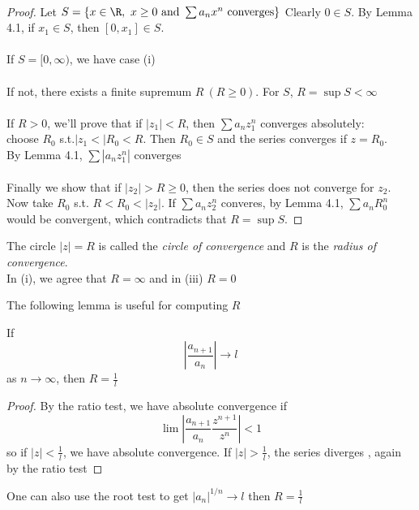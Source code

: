 \begin{theorem}
\begin{tikzpicture}[x=0.75pt,y=0.75pt,yscale=-1,xscale=1]
\end{tikzpicture}\\
\begin{proof}
Let $S = \{x\in\R, \ x\geq 0\text{ and }\sum a_nx^n\text{ converges}\}$
Clearly $0\in S$. By Lemma 4.1, if $x_1\in S$, then $[0,x_1]\in S$.\\
\\
If $S = [0,\infty)$, we have case (i)\\
\\
If not, there exists a finite supremum $R \ (R\geq 0)$. For $S$, $R = \sup S < \infty$\\
\\
If $R>0$, we'll prove that if $|z_1|<R$, then $\sum a_n z_1^n$ converges absolutely:\\
choose $R_0$ s.t.$|z_1<|R_0<R$. Then $R_0\in S$ and the series converges if $z=R_0$.\\ By Lemma 4.1, $\sum |a_nz_1^n|$ converges\\
\\
Finally we show that if $|z_2|>R\geq 0$, then the series does not converge for $z_2$. Now take $R_0$ s.t. $R<R_0<|z_2|$. If $\sum a_n z_2^n$ converes, by Lemma 4.1, $\sum a_nR_0^n$ would be convergent, which contradicts that $R = \sup S$.

\end{proof}
\end{theorem}
\begin{definition}
The circle $|z| = R$ is called the \emph{circle of convergence} and $R$ is the \emph{radius of convergence}.\\
In (i), we agree that $R=\infty$ and in (iii) $R = 0$
\end{definition}
\begin{normal}
The following lemma is useful for computing $R$
\end{normal}
\begin{lemma}
If
\[\left|\frac{a_{n+1}}{a_n}\right| \to l\]
as $n\to \infty$, then $R = \frac{1}{l}$
\begin{proof}
By the ratio test, we have absolute convergence if
\[\lim \left| \frac{a_{n+1}}{a_n}\frac{z^{n+1}}{z^n}\right| < 1\]
so if $|z|<\frac{1}{l}$, we have absolute convergence. If $|z|>\frac{1}{l}$, the series diverges , again by the ratio test
\end{proof}
\end{lemma}
\begin{remark}
One can also use the root test to get $|a_n|^{1/n}\to l$ then $R = \frac{1}{l}$
\end{remark}
